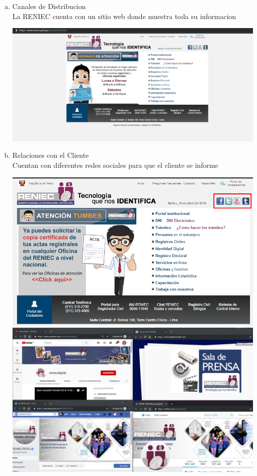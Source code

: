 \begin{enumerate}[1.]
\begin{enumerate}[a)]
\item Canales de Distribucion \\
La RENIEC cuenta con un sitio web donde muestra toda su informacion
 \begin{center}
                    \includegraphics[scale=0.30]{./Imagenes/c.png}
                    \end{center}
\item Relaciones con el Cliente \\
Cuentan con diferentes redes sociales para que el cliente se informe
 \begin{center}
                    \includegraphics[scale=0.30]{./Imagenes/d.png}
\includegraphics[scale=0.30]{./Imagenes/e3.png}

\end{center}
\end{enumerate}
\end{enumerate}
